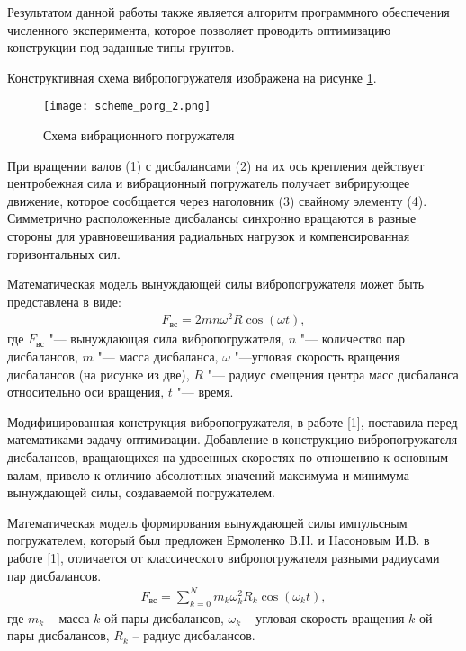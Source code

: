 Результатом данной работы также является алгоритм программного обеспечения численного эксперимента, которое позволяет проводить оптимизацию конструкции под заданные типы грунтов.

Конструктивная схема вибропогружателя изображена на рисунке \ref{fig:scheme_porg}.
\begin{figure}[h]
    \centering
    \texttt{[image: scheme\_porg\_2.png]}
    \caption{Схема вибрационного погружателя}
    \label{fig:scheme_porg}
\end{figure}

При вращении валов (1) с дисбалансами (2) на их ось крепления действует центробежная сила и вибрационный погружатель получает вибрирующее движение,
которое сообщается через наголовник (3) свайному элементу (4). Симметрично расположенные дисбалансы синхронно вращаются в разные стороны для уравновешивания радиальных нагрузок и компенсированная горизонтальных сил.

Математическая модель вынуждающей силы вибропогружателя может быть представлена в виде:
\begin{equation}\label{eq:centrifugal}
    \begin{gathered}
        F_{\textrm{вс}} = 2mn\omega^2 R\cos(\omega t),
    \end{gathered}
\end{equation}
\noindent где $F_{\textrm{вс}}$ "--- вынуждающая сила вибропогружателя, $n$ "--- количество пар дисбалансов, $m$ "--- масса дисбаланса, $\omega$ "---угловая скорость вращения дисбалансов (на рисунке из две),
$R$ "--- радиус смещения центра масс дисбаланса относительно оси вращения, $t$ "--- время.

Модифицированная конструкция вибропогружателя,  в работе [1], поставила перед математиками задачу оптимизации.
Добавление в конструкцию вибропогружателя дисбалансов, вращающихся на удвоенных скоростях по отношению к основным валам, привело к отличию абсолютных
значений максимума и минимума вынуждающей силы, создаваемой погружателем.

Математическая модель формирования вынуждающей силы импульсным погружателем, который был предложен Ермоленко В.Н. и Насоновым И.В. в работе [1], отличается от классического вибропогружателя разными радиусами пар дисбалансов.
\begin{equation}\label{eq:short_harmonic_sum}
    \begin{gathered}
        F_{\textrm{вс}} = \sum\limits_{k = 0}^N m_k \omega_k^2 R_k \cos(\omega_k t),
    \end{gathered}
\end{equation}
\noindent где $m_k$ – масса $k$-ой пары дисбалансов, $\omega_k$ – угловая скорость вращения $k$-ой пары дисбалансов, $R_k$ – радиус дисбалансов.

